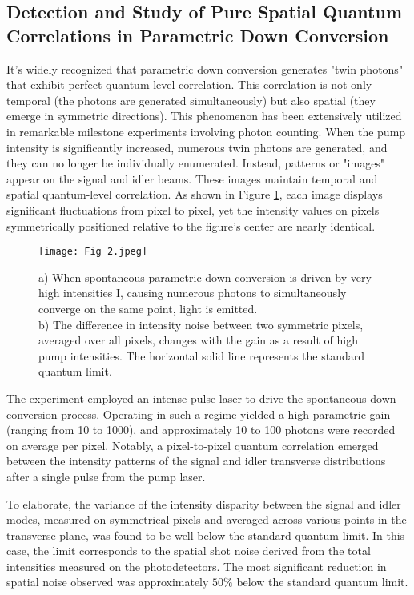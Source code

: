 \documentclass{article}
\begin{document}
\subsection{Detection and Study of Pure Spatial Quantum Correlations in Parametric
Down Conversion}
It's widely recognized that parametric down conversion generates "twin photons" \cite{neves2005generation} that exhibit perfect quantum-level correlation. This correlation is not only temporal (the photons are generated simultaneously) but also spatial (they emerge in symmetric directions). This phenomenon has been extensively utilized in remarkable milestone experiments involving photon counting. When the pump intensity is significantly increased, numerous twin photons are generated, and they can no longer be individually enumerated. Instead, patterns or "images" appear on the signal and idler beams. These images maintain temporal and spatial quantum-level correlation. As shown in Figure \ref{fig:2}, each image displays significant fluctuations from pixel to pixel, yet the intensity values on pixels symmetrically positioned relative to the figure's center are nearly identical.
\begin{figure}
    \centering
    \texttt{[image: Fig 2.jpeg]}
    \caption{a) When spontaneous parametric down-conversion is driven by very high intensities I, causing numerous photons to simultaneously converge on the same point, light is emitted.\\
b) The difference in intensity noise between two symmetric pixels, averaged over all pixels, changes with the gain as a result of high pump intensities. The horizontal solid line represents the standard quantum limit.}
    \label{fig:2}
\end{figure}

The experiment \cite{PhysRevLett.93.243601} employed an intense pulse laser to drive the spontaneous down-conversion process. Operating in such a regime yielded a high parametric gain (ranging from 10 to 1000), and approximately 10 to 100 photons were recorded on average per pixel. Notably, a pixel-to-pixel quantum correlation emerged between the intensity patterns of the signal and idler transverse distributions after a single pulse from the pump laser.

To elaborate, the variance of the intensity disparity between the signal and idler modes, measured on symmetrical pixels and averaged across various points in the transverse plane, was found to be well below the standard quantum limit. In this case, the limit corresponds to the spatial shot noise derived from the total intensities measured on the photodetectors. The most significant reduction in spatial noise observed was approximately $50\%$ below the standard quantum limit.
\end{document}
